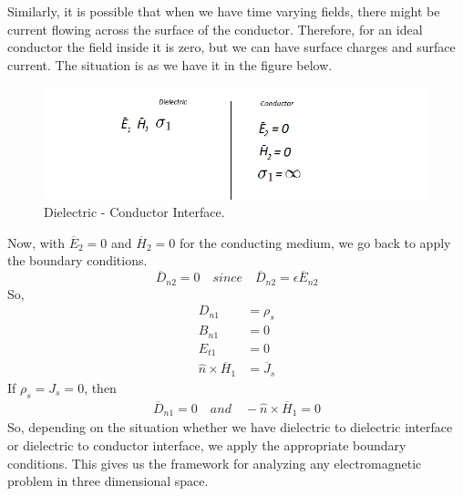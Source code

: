 Similarly, it is possible that when we have time varying fields, there might be current flowing across the surface of the conductor. Therefore, for an ideal conductor the field inside it is zero, but we can have surface charges and surface current. The situation is as we have it in the figure below.
\begin{figure}[h]
\centering
\includegraphics[width=1\linewidth]{./graphics/diemedium5_2_2}
\caption{Dielectric - Conductor Interface.}
\end{figure}

Now, with $\overline{E}_2 = 0$ and $\overline{H}_2 = 0$ for the conducting medium, we go back to apply the boundary conditions.
\begin{equation*}
\overline{D}_{n2} = 0\quad since\quad \overline{D}_{n2} = \epsilon\overline{E}_{n2}
\end{equation*}
So,
\begin{align*}
D_{n1} &= \rho_s \\
B_{n1} &= 0 \\
E_{t1} &= 0 \\
\hat{n}\times\overline{H}_1 &= \overline{J}_s
\end{align*}
If $\rho_s = J_s = 0$, then
\begin{align*}
\overline{D}_{n1} = 0\quad and \quad -\hat{n}\times\overline{H}_{1} = 0
\end{align*}
So, depending on the situation whether we have dielectric to dielectric interface or dielectric to conductor interface, we apply the appropriate boundary conditions. This gives us the framework for analyzing any electromagnetic problem in three dimensional space. 

